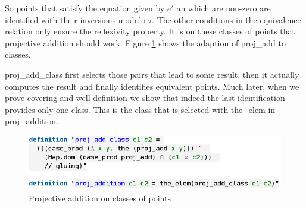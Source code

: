 So points that satisfy the equation given by $e'$ an which are non-zero are identified with their inversions modulo $\tau$. The other conditions in the equivalence relation only ensure the reflexivity property. It is on these classes of points that projective addition should work. Figure \ref{fig:proj_add_class} shows the adaption of proj\_add to classes. 

proj\_add\_class first selects those pairs that lead to some result, then it actually computes the result and finally identifies equivalent points. Much later, when we prove covering and well-definition we show that indeed the last identification provides only one class. This is the class that is selected with the\_elem in proj\_addition.

\begin{figure}[!h]
	\centering
	\includegraphics[width=\linewidth,height=\textheight,keepaspectratio]{img/proj_add_class.png}
	\caption{Projective addition on classes of points}
	\label{fig:proj_add_class}
\end{figure}








